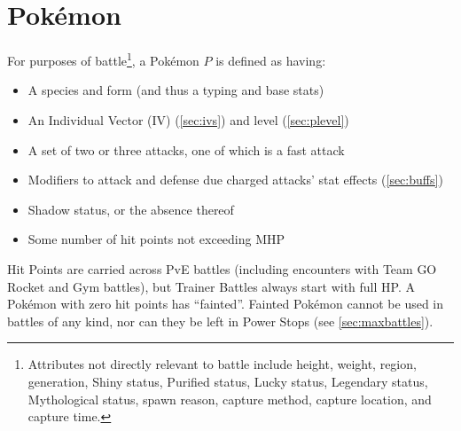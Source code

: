 \chapter{Pokémon\label{chap:pokemon}}
For purposes of battle\footnote{Attributes not directly relevant to battle include height, weight, region,
generation, Shiny status, Purified status, Lucky status, Legendary status, Mythological status, spawn
reason, capture method, capture location, and capture time.}, a Pokémon $P$ is defined as having:
\begin{itemize}
\item A species and form (and thus a typing and base stats)
\item An Individual Vector (IV) (\autoref{sec:ivs}) and level (\autoref{sec:plevel})
\item A set of two or three attacks, one of which is a fast attack
\item Modifiers to attack and defense due charged attacks' stat effects (\autoref{sec:buffs})
\item Shadow status, or the absence thereof
\item Some number of hit points not exceeding MHP
\end{itemize}
Hit Points are carried across PvE battles (including encounters with
  Team GO Rocket and Gym battles), but Trainer Battles always start with full HP\@.
A Pokémon with zero hit points has ``fainted''.
Fainted Pokémon cannot be used in battles of any kind, nor can they be left in
 Power Stops (see \autoref{sec:maxbattles}).

